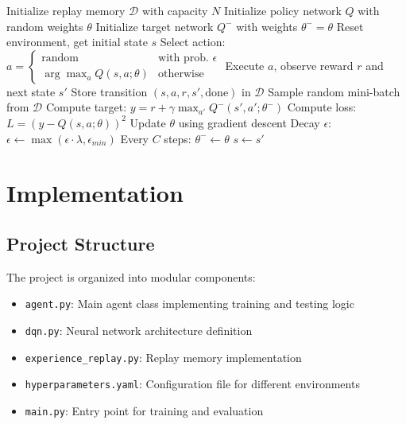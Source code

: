\documentclass[12pt,a4paper]{article}
\begin{document}
\begin{algorithm}
\caption{DQN Training Loop}
\begin{algorithmic}
\State Initialize replay memory $\mathcal{D}$ with capacity $N$
\State Initialize policy network $Q$ with random weights $\theta$
\State Initialize target network $Q^-$ with weights $\theta^- = \theta$
    \State Reset environment, get initial state $s$
        \State Select action: $a = \begin{cases} 
        \text{random} & \text{with prob. } \epsilon \\
        \arg\max_a Q(s, a; \theta) & \text{otherwise}
        \end{cases}$
        \State Execute $a$, observe reward $r$ and next state $s'$
        \State Store transition $(s, a, r, s', \text{done})$ in $\mathcal{D}$
        \State Sample random mini-batch from $\mathcal{D}$
        \State Compute target: $y = r + \gamma \max_{a'} Q^-(s', a'; \theta^-)$
        \State Compute loss: $L = (y - Q(s, a; \theta))^2$
        \State Update $\theta$ using gradient descent
        \State Decay $\epsilon$: $\epsilon \leftarrow \max(\epsilon \cdot \lambda, \epsilon_{min})$
        \State Every $C$ steps: $\theta^- \leftarrow \theta$
        \State $s \leftarrow s'$
    \EndFor
\EndFor
\end{algorithmic}
\end{algorithm}

\section{Implementation}

\subsection{Project Structure}
The project is organized into modular components:

\begin{itemize}
    \item \texttt{agent.py}: Main agent class implementing training and testing logic
    \item \texttt{dqn.py}: Neural network architecture definition
    \item \texttt{experience\_replay.py}: Replay memory implementation
    \item \texttt{hyperparameters.yaml}: Configuration file for different environments
    \item \texttt{main.py}: Entry point for training and evaluation
\end{itemize}
\end{document}
